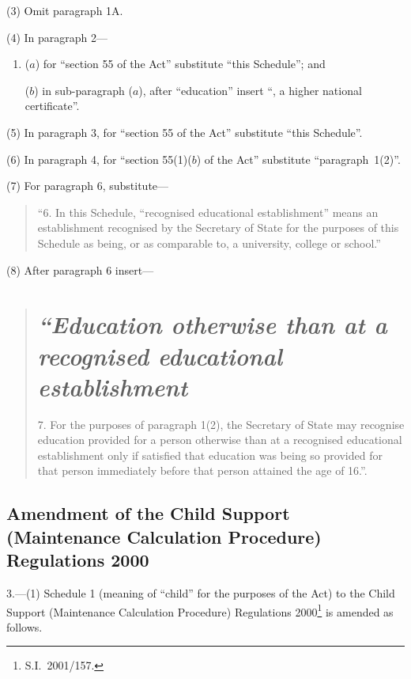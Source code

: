 \documentclass[12pt,a4paper]{article}
\begin{document}
(3) Omit paragraph 1A.

(4) In paragraph 2—
\begin{enumerate}\item[]
($a$) for “section 55 of the Act” substitute “this Schedule”; and

($b$) in sub-paragraph ($a$), after “education” insert “, a higher national certificate”.
\end{enumerate}

(5) In paragraph 3, for “section 55 of the Act” substitute “this Schedule”.

(6) In paragraph 4, for “section 55(1)($b$)  of the Act” substitute “paragraph~1(2)”.

(7) For paragraph 6, substitute—
\begin{quotation}
“6.  In this Schedule, “recognised educational establishment” means an establishment recognised by the Secretary of State for the purposes of this Schedule as being, or as comparable to, a university, college or school.”
\end{quotation}

(8) After paragraph 6 insert—
\begin{quotation}
\section*{\itshape “Education otherwise than at a recognised educational establishment}

7.  For the purposes of paragraph 1(2), the Secretary of State may recognise education provided for a person otherwise than at a recognised educational establishment only if satisfied that education was being so provided for that person immediately before that person attained the age of 16.”.
\end{quotation}

\subsection[3. Amendment of the Child Support (Maintenance Calculation Procedure) Regulations 2000]{Amendment of the Child Support (Maintenance Calculation Procedure) Regulations 2000}

3.---(1)  Schedule 1 (meaning of “child” for the purposes of the Act) to the Child Support (Maintenance Calculation Procedure) Regulations 2000\footnote{S.I.~2001/157.} is amended as follows.
\end{document}

